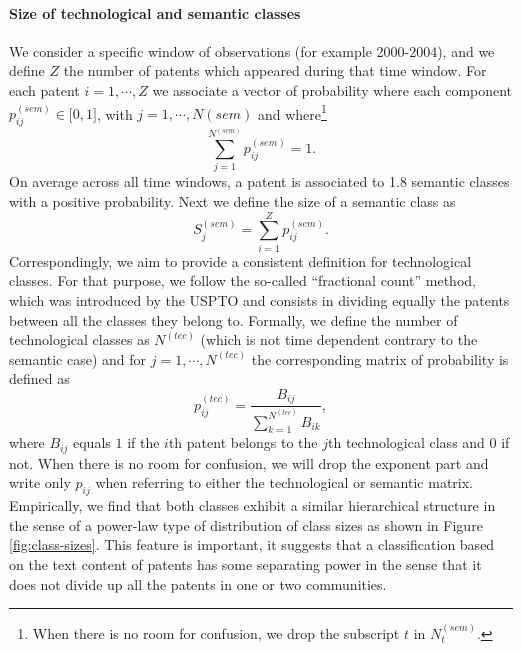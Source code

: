 \documentclass[article]{article}%
\begin{document}
\paragraph*{Size of technological and semantic classes} 
We consider a specific window of observations (for example 2000-2004), and we define $Z$ the number of patents which appeared during that time window. For each patent $i=1, \cdots, Z$ we associate a vector of probability where each component $p_{ij}^{(sem)} \in \big[ 0,1 \big]$, with  $j = 1, \cdots, N{(sem)}$ and where\footnote{When there is no room for confusion, we drop the subscript $t$ in $N_t^{(sem)}$.} 
$$\displaystyle \sum_{j=1}^{N^{(sem)}} p_{ij}^{(sem)} = 1.$$ On average across all time windows, a patent is associated to 1.8 semantic classes with a positive probability. Next we define the size of a semantic class as $$S_j^{(sem)} = \displaystyle \sum_{i=1}^Z p_{ij}^{(sem)}.$$ 
Correspondingly, we aim to provide a consistent definition for technological classes. For that purpose, we follow the so-called ``fractional count'' method, which was introduced by the USPTO and consists in dividing equally the patents between all the classes they belong to. Formally, we define the number of technological classes as
$N^{(tec)}$  (which is not time dependent contrary to the semantic case) and for $j = 1, \cdots, N^{(tec)}$ the corresponding matrix of probability is defined as
\[
 p_{ij}^{(tec)} = \frac{B_{ij}}{\displaystyle \sum_{k=1}^{N^{(tec)}}{B_{ik}}},
\]
where  $B_{ij}$ equals $1$ if the $i$th patent belongs to the $j$th technological class and $0$ if not. When there is no room for confusion, we will drop the exponent part and write only $p_{ij}$ when referring to either the technological or semantic matrix. Empirically, we find that both classes exhibit a similar hierarchical structure in the sense of a power-law type of distribution of class sizes as shown in Figure \ref{fig:class-sizes}. This feature is important, it suggests that a classification based on the text content of patents has some separating power in the sense that it does not divide up all the patents in one or two communities. 
\end{document}
